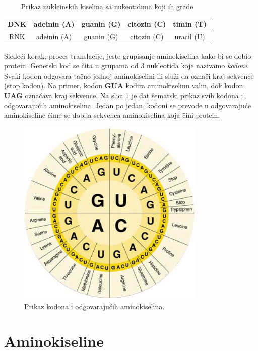 \begin{table}[H]
	\centering
	\caption{Prikaz nukleinskih kiselina sa nukeotidima koji ih grade}
	\label{tab: nucleotides}
	\begin{tabular}{|c|c|c|c|c|}
		\hline
		DNK & adeinin (A) & guanin (G) & citozin (C) & timin (T) \\
		\hline
		RNK & adeinin (A) & guanin (G) & citozin (C) & uracil (U) \\
		\hline             
	\end{tabular}
\end{table}


Sledeći korak, proces translacije, jeste grupisanje aminokiselina kako bi se dobio protein. Genetski kod se čita u grupama od 3 nukleotida koje nazivamo \textit{kodoni}. Svaki kodon odgovara tačno jednoj aminokiselini ili služi da označi kraj sekvence (stop kodon). Na primer, kodon \textbf{GUA} kodira aminokiselinu valin, dok kodon \textbf{UAG} označava kraj sekvence. Na slici \ref{fig:codons} je dat šematski prikaz svih kodona i odgovarajućih aminokiselina. Jedan po jedan, kodoni se prevode u odgovarajuće aminokiseline čime se dobija sekvenca aminokiselina koja čini protein. \cite{BMBG, synthesisOnl}

\begin{figure}[h]
	\centering
	\includegraphics[width=0.8\textwidth]{Figures/codons_chart.png}
	\caption{Prikaz kodona i odgovarajućih aminokiselina.}
	\label{fig:codons}
\end{figure}


\section{Aminokiseline}

